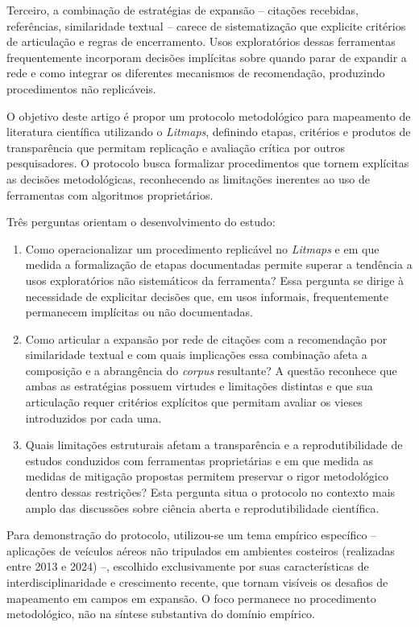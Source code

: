 \documentclass[portuguese]{textolivre}
\begin{document}
	Terceiro, a combinação de estratégias de expansão – citações recebidas, referências, similaridade textual – carece de sistematização que explicite critérios de articulação e regras de encerramento. Usos exploratórios dessas ferramentas frequentemente incorporam decisões implícitas sobre quando parar de expandir a rede e como integrar os diferentes mecanismos de recomendação, produzindo procedimentos não replicáveis.
    
	O objetivo deste artigo é propor um protocolo metodológico para mapeamento de literatura científica utilizando o \textit{Litmaps}, definindo etapas, critérios e produtos de transparência que permitam replicação e avaliação crítica por outros pesquisadores. O protocolo busca formalizar procedimentos que tornem explícitas as decisões metodológicas, reconhecendo as limitações inerentes ao uso de ferramentas com algoritmos proprietários.
    
	Três perguntas orientam o desenvolvimento do estudo:

    \begin{enumerate}
        \item Como operacionalizar um procedimento replicável no \textit{Litmaps} e em que medida a formalização de etapas documentadas permite superar a tendência a usos exploratórios não sistemáticos da ferramenta? Essa pergunta se dirige à necessidade de explicitar decisões que, em usos informais, frequentemente permanecem implícitas ou não documentadas.
\item Como articular a expansão por rede de citações com a recomendação por similaridade textual e com quais implicações essa combinação afeta a composição e a abrangência do \textit{corpus} resultante? A questão reconhece que ambas as estratégias possuem virtudes e limitações distintas e que sua articulação requer critérios explícitos que permitam avaliar os vieses introduzidos por cada uma.
\item Quais limitações estruturais afetam a transparência e a reprodutibilidade de estudos conduzidos com ferramentas proprietárias e em que medida as medidas de mitigação propostas permitem preservar o rigor metodológico dentro dessas restrições? Esta pergunta situa o protocolo no contexto mais amplo das discussões sobre ciência aberta e reprodutibilidade científica.
    \end{enumerate}

    Para demonstração do protocolo, utilizou-se um tema empírico específico – aplicações de veículos aéreos não tripulados em ambientes costeiros (realizadas entre 2013 e 2024) –, escolhido exclusivamente por suas características de interdisciplinaridade e crescimento recente, que tornam visíveis os desafios de mapeamento em campos em expansão. O foco permanece no procedimento metodológico, não na síntese substantiva do domínio empírico.
    
\end{document}
